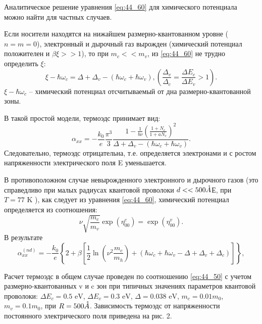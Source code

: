 Аналитическое решение уравнения \eqref{eq:44_60} для химического потенциала можно найти для частных случаев.
 
Если носители находятся на нижайшем размерно-квантованном уровне ($n=m=0$), электронный и дырочный газ вырожден (химический потенциал положителен и $\beta \xi >>1$), то при $m_{c} <<m_{v} $, из \eqref{eq:44_60} не трудно определить $\xi $:
\[
\xi -\hbar \omega _{c} =\Delta +\Delta _{v} -\left(\hbar \omega _{c} +\hbar \omega _{v} \right), \left(\frac{\Delta _{v} }{\Delta _{c} } =\frac{\Delta E_{c} }{\Delta E_{v} } >1\right).
\] 
$\xi -\hbar \omega _{c} $ -- химический потенциал отсчитываемый от дна размерно-квантованной зоны.

В такой простой модели, термоэдс принимает вид:
\begin{equation} \label{eq:44_70}
\alpha _{xx} =-\frac{k_{0} }{e} \frac{\pi ^{3} }{3} \frac{1-\frac{1}{b\nu } \left(\frac{1+N_{c} }{1+aN_{c} } \right)^{2} }{\Delta +\Delta _{v} -\left(\hbar \omega _{c} +\hbar \omega _{v} \right)} .
\end{equation} 
Следовательно, термоэдс отрицательна, т.е. определяется электронами и с ростом напряженности электрического поля E уменьшается.

В противоположном случае невырожденного электронного и дырочного газов (это справедливо при малых радиусах квантовой проволоки $d<<500 \AA$Е, при $T=77 \text{ K}$ \cite{Black2002}), как следует из уравнения \eqref{eq:44_60}, химический потенциал определяется из соотношения:
\begin{equation} \label{eq:44_80}
\nu \sqrt{\frac{m_{c} }{m_{v} } } \exp \left(\eta _{00}^{c} \right)=\exp \left(\eta _{00}^{v} \right).
\end{equation}  
В результате
\begin{equation} \label{eq:44_90}
\alpha _{xx}^{(nd)} =-\frac{k_{0} }{e} \left\{2+\beta \left[\frac{1}{2} \ln (\nu ^{2} \frac{m_{c} }{m_{h} } )+\left(\hbar \omega _{c} +\hbar \omega _{v} -\Delta +\Delta _{v} +\Delta _{c} \right)\right]\right\},
\end{equation} 
 
Расчет термоэдс в общем случае проведен по соотношению \eqref{eq:44_50} с учетом размерно-квантованных v и c зон при типичных значениях параметров квантовой проволоки: $\Delta E_{c} =0.5 \text{ eV}$, $\Delta E_{v} =0.3 \text{ eV}$, $\Delta =0.038 \text{ eV}$, $m_{c} =0.01m_{0} $, $m_{v} =0.1m_{0} $, при $R=500 \AA$. Зависимость термоэдс от напряженности постоянного электрического поля приведена на рис. 2. 
 
